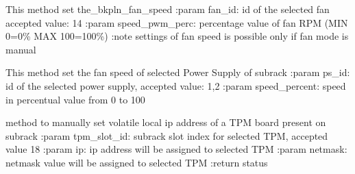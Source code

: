 \documentclass[letterpaper,10pt,english]{sphinxmanual}
\begin{document}
\begin{fulllineitems}

\begin{fulllineitems}
\label{\detokenize{apidocs:subrack_management_board.SubrackMngBoard.SetFanSpeed}}
\pysigstartsignatures
{}
\pysigstopsignatures
\sphinxAtStartPar
This method set the\_bkpln\_fan\_speed
:param fan\_id: id of the selected fan accepted value: 1\sphinxhyphen{}4
:param speed\_pwm\_perc: percentage value of fan RPM  (MIN 0=0\% \sphinxhyphen{} MAX 100=100\%)
:note settings of fan speed is possible only if fan mode is manual

\end{fulllineitems}


\begin{fulllineitems}
\label{\detokenize{apidocs:subrack_management_board.SubrackMngBoard.SetPSFanSpeed}}
\pysigstartsignatures
{}
\pysigstopsignatures
\sphinxAtStartPar
This method set the fan speed of selected Power Supply of subrack
:param ps\_id: id of the selected power supply, accepted value: 1,2
:param speed\_percent: speed in percentual value from 0 to 100

\end{fulllineitems}


\begin{fulllineitems}
\label{\detokenize{apidocs:subrack_management_board.SubrackMngBoard.SetTPMIP}}
\pysigstartsignatures
{}
\pysigstopsignatures
\sphinxAtStartPar
method to manually set volatile local ip address of a TPM board present on subrack
:param tpm\_slot\_id: subrack slot index for selected TPM, accepted value 1\sphinxhyphen{}8
:param ip: ip address will be assigned to selected TPM
:param netmask: netmask value will be assigned to selected TPM
:return status


\end{fulllineitems}
\end{fulllineitems}
\end{document}
